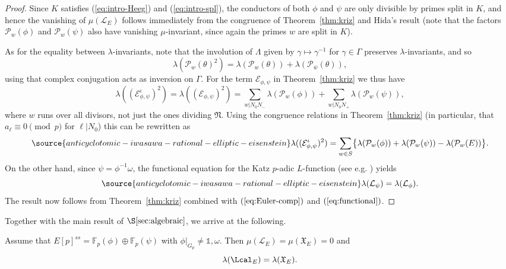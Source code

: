\begin{proof}
Since $K$ satisfies (\ref{eq:intro-Heeg}) and (\ref{eq:intro-spl}), the conductors of both $\phi$ and $\psi$ are only divisible by primes split in $K$, and hence the vanishing of $\mu(\mathcal{L}_E)$ follows immediately from the congruence of Theorem~\ref{thm:kriz} and Hida's result \cite{hidamu-0} (note that the factors $\mathcal{P}_w(\phi)$ and $\mathcal{P}_w(\psi)$ also have vanishing $\mu$-invariant, since again the primes $w$ are split in $K$).

As for the equality between $\lambda$-invariants, note that the involution of $\Lambda$ given by $\gamma\mapsto\gamma^{-1}$ for $\gamma\in\Gamma$
preserves $\lambda$-invariants, and so
\[
\lambda(\mathcal{P}_w(\theta)^2)=\lambda(\mathcal{P}_w(\theta))+\lambda(\mathcal{P}_{\bar{w}}(\theta)),
\]
using that complex conjugation acts as inversion on $\Gamma$. For the term $\mathcal{E}_{\phi,\psi}$ in Theorem~\ref{thm:kriz} we thus have
\[
\lambda((\mathcal{E}_{\phi,\psi}^\iota)^2)=
\lambda((\mathcal{E}_{\phi,\psi})^2)=\sum_{w\vert N_0N_-}\lambda(\mathcal{P}_w(\phi))+\sum_{w\vert N_0N_+}\lambda(\mathcal{P}_w(\psi)),
\]
where $w$ runs over all divisors, not just the ones dividing $\mathfrak{N}$. Using the congruence relations in Theorem~\ref{thm:kriz} (in particular, that $a_\ell\equiv 0\pmod{p}$ for $\ell\vert N_0$) this can be rewritten as
\begin{equation}\label{eq:Euler-comp}
\source{anticyclotomic-iwasawa-rational-elliptic-eisenstein}
\lambda((\mathcal{E}_{\phi,\psi}^\iota)^2)=\sum_{w\in S}\bigl\{\lambda(\mathcal{P}_w(\phi))+\lambda(\mathcal{P}_w(\psi))-\lambda(\mathcal{P}_w(E))\bigr\}.
\end{equation}
On the other hand, since $\psi=\phi^{-1}\omega$, the functional equation for the Katz $p$-adic $L$-function (see e.g. \cite[Thm.~27]{kriz}) yields
\begin{equation}\label{eq:functional}
\source{anticyclotomic-iwasawa-rational-elliptic-eisenstein}
\lambda(\mathcal{L}_\psi)=\lambda(\mathcal{L}_\phi).
\end{equation}
The result now follows from Theorem~\ref{thm:kriz} combined with $(\ref{eq:Euler-comp})$ and $(\ref{eq:functional})$.
\end{proof}

Together with the main result of $\S\ref{sec:algebraic}$, we arrive at the following.

\begin{theorem}
\notready\label{mulambda}
Assume that $E[p]^{ss}=\mathbb{F}_p(\phi)\oplus\mathbb{F}_p(\psi)$ with $\phi\vert_{G_p}\neq\mathds{1},\omega$. Then $\mu(\mathcal{L}_E)=\mu(\mathfrak{X}_E)=0$ and
\[
\lambda(\Lcal_E)=\lambda(\mathfrak{X}_E).
\]
\end{theorem}

